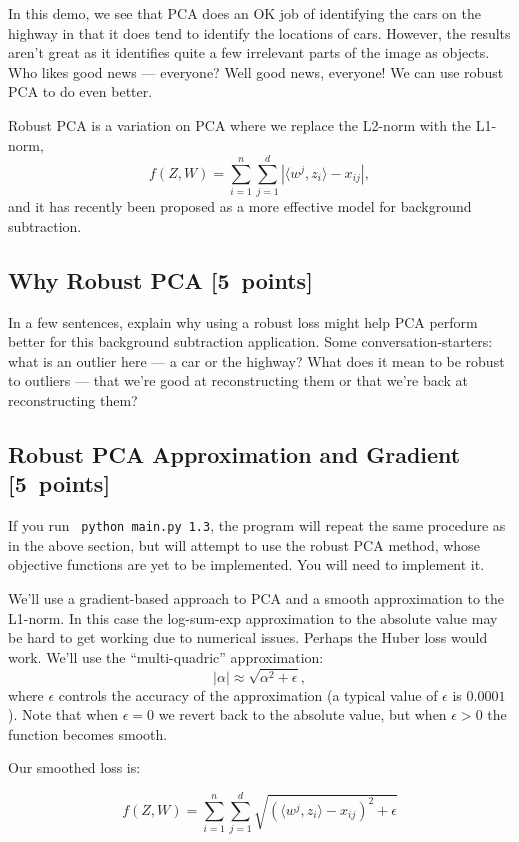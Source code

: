 \documentclass{article}
\newcommand{\blu}[1]{{\textcolor{blu}{#1}}}
\let\ask\blu
\newcommand\pts[1]{\textcolor{pointscolour}{[#1~points]}}
\begin{document}
In this demo, we see that PCA does an OK job of identifying the cars on the highway in that it does tend to identify the locations of cars. However, the results aren't great as it identifies quite a few irrelevant parts of the image as objects. Who likes good news --- everyone? Well good news, everyone! We can use robust PCA to do even better.

Robust PCA is a variation on PCA where we replace the L2-norm with the L1-norm,
\[
f(Z,W) = \sum_{i=1}^n\sum_{j=1}^d |\langle w^j, z_i\rangle - x_{ij}|,
\]
and it has recently been proposed as a more effective model for background subtraction.

\subsection{Why Robust PCA \pts{5}}

\ask{In a few sentences, explain why using a robust loss might help PCA perform better for this background subtraction application.} Some conversation-starters: what is an outlier here --- a car or the highway? What does it mean to be robust to outliers --- that we're good at reconstructing them or that we're back at reconstructing them?

\subsection{Robust PCA Approximation and Gradient \pts{5}}

If you run \verb| python main.py 1.3|, the program will repeat the same procedure as in the above section, but will attempt to use the robust PCA method, whose objective functions are yet to be implemented. You will need to implement it.

We'll use a gradient-based approach to PCA and a smooth approximation to the L1-norm. In this case the log-sum-exp approximation to the absolute value may be hard to get working due to numerical issues. Perhaps the Huber loss would work. We'll use the ``multi-quadric'' approximation:
\[
|\alpha| \approx \sqrt{\alpha^2 + \epsilon},
\]
where $\epsilon$ controls the accuracy of the approximation (a typical value of $\epsilon$ is $0.0001$). Note that when $\epsilon=0$ we revert back to the absolute value, but when $\epsilon>0$ the function becomes smooth.

Our smoothed loss is:

\[
f(Z,W) = \sum_{i=1}^n\sum_{j=1}^d \sqrt{(\langle w^j, z_i\rangle - x_{ij})^2 + \epsilon }
\]
\end{document}
